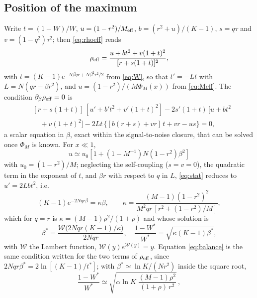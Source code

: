 \documentclass{SciPost}
\theoremstyle{plain}
\theoremstyle{definition}
\newcommand{\Meff}{M_{\rm eff}}
\begin{document}
\begin{appendix}
\section{Position of the maximum}
Write $t=(1-W)/W$, $u=(1-r^2)/\Meff$, $b=(r^2+u)/(K-1)$, $s=q\tau$ and $v=(1-q^2)\tau^2$; then \eqref{eq:rhoeff} reads
\begin{equation*}
\rho_{\rm eff}=\frac{u+bt^2+v(1+t)^2}{[r+s(1+t)]^2},
\end{equation*}
with $t=(K-1)e^{-N\beta qr+N\beta^2r^2/2}$ from \eqref{eq:W}, so that $t'=-Lt$ with $L=N(qr-\beta r^2)$, and $u=(1-r^2)/(M\Phi_M(x))$ from \eqref{eq:Meff}. The condition $\partial_\beta\rho_{\rm eff}=0$ is
\begin{align}
&[r+s(1+t)]\,[u'+b't^2+v'(1+t)^2]-2s'(1+t)\,[u+bt^2\nonumber\\
&\quad+v(1+t)^2]-2Lt\,\{[b(r+s)+vr]\,t+vr-us\}=0,
\label{eq:stat}
\end{align}
a scalar equation in $\beta$, exact within the signal-to-noise closure, that can be solved once $\Phi_M$ is known. For $x\ll1$,
\begin{equation*}
u\simeq u_0[1+(1-M^{-1})N(1-r^2)\beta^2]
\end{equation*}
with $u_0=(1-r^2)/M$; neglecting the self-coupling ($s=v=0$), the quadratic term in the exponent of $t$, and $\beta r$ with respect to $q$ in $L$, \eqref{eq:stat} reduces to $u'=2Lbt^2$, i.e.
\begin{equation}
(K-1)e^{-2Nqr\beta}=\kappa\beta,\qquad \kappa=\frac{(M-1)(1-r^2)^2}{M^2qr\,[r^2+(1-r^2)/M]},
\end{equation}
which for $q=r$ is $\kappa=(M-1)\rho^2/(1+\rho)$ and whose solution is
\begin{equation}
\beta^*=\frac{\mathcal W\big(2Nqr(K-1)/\kappa\big)}{2Nqr},\quad \frac{1-W^*}{W^*}=\sqrt{\kappa(K-1)\beta^*},
\label{eq:betastar}
\end{equation}
with $\mathcal W$ the Lambert function, $\mathcal W(y)e^{\mathcal W(y)}=y$. Equation \eqref{eq:balance} is the same condition written for the two terms of $\rho_{\rm eff}$, since $2Nqr\beta^*=2\ln[(K-1)/t^*]$; with $\beta^*\simeq\ln K/(Nr^2)$ inside the square root,
\begin{equation*}
\frac{1-W^*}{W^*}\simeq\sqrt{\alpha\ln K\;\frac{(M-1)\rho^2}{(1+\rho)\,r^2}}\,,
\end{equation*}

\end{appendix}
\end{document}
